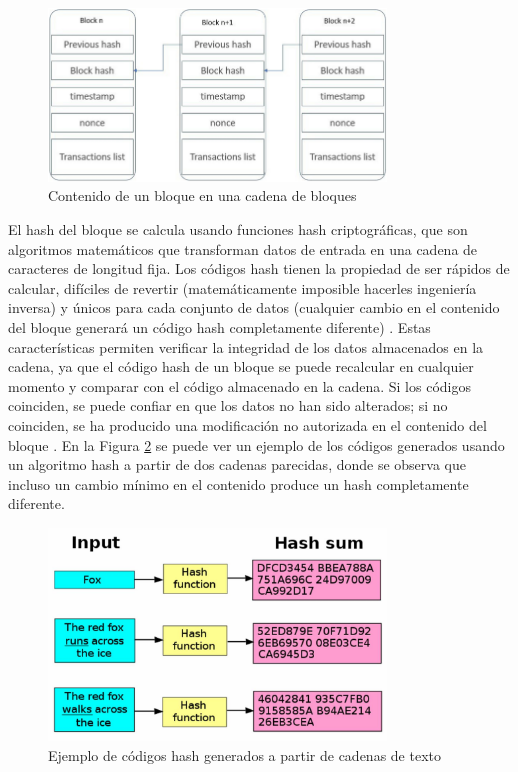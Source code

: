 \begin{figure}[!htpb]
    \centering
    \includegraphics[width=0.8\textwidth]{Figures/blockchain-structure.png}
    \caption{Contenido de un bloque en una cadena de bloques}
    \label{fig:blockchain-structure}
\end{figure}

El hash del bloque se calcula usando funciones hash criptográficas, que son algoritmos matemáticos que transforman datos de entrada en una cadena de caracteres de longitud fija. Los códigos hash tienen la propiedad de ser rápidos de calcular, difíciles de revertir (matemáticamente imposible hacerles ingeniería inversa) y únicos para cada conjunto de datos (cualquier cambio en el contenido del bloque generará un código hash completamente diferente) \cite{pending}. Estas características permiten verificar la integridad de los datos almacenados en la cadena, ya que el código hash de un bloque se puede recalcular en cualquier momento y comparar con el código almacenado en la cadena. Si los códigos coinciden, se puede confiar en que los datos no han sido alterados; si no coinciden, se ha producido una modificación no autorizada en el contenido del bloque \cite{pending}. En la Figura \ref{fig:hash-example} se puede ver un ejemplo de los códigos generados usando un algoritmo hash a partir de dos cadenas parecidas, donde se observa que incluso un cambio mínimo en el contenido produce un hash completamente diferente. 

\begin{figure}[!htpb]
    \centering
    \includegraphics[width=0.8\textwidth]{Figures/hash-example.jpg}
    \caption{Ejemplo de códigos hash generados a partir de cadenas de texto}
    \label{fig:hash-example}
\end{figure}

